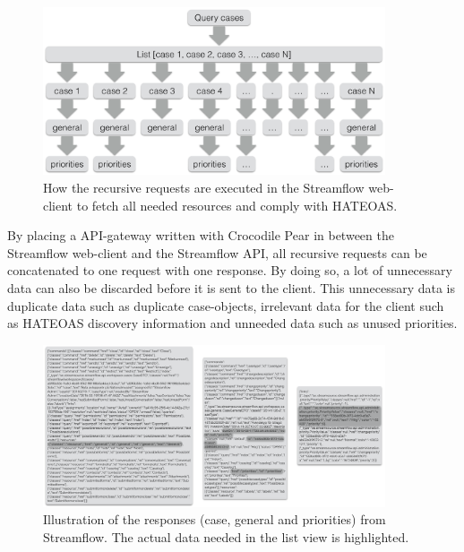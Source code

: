 \documentclass{cslthse-msc}
\begin{document}
\begin{figure}[H]
  \centering
    \begin{center}
      \includegraphics[width=0.9\textwidth]{images/streamflow_cases.png}
    \end{center}
  \caption{How the recursive requests are executed in the Streamflow web-client to fetch all needed resources and comply with HATEOAS.}
\end{figure}

By placing a API-gateway written with Crocodile Pear in between the Streamflow web-client and the Streamflow API, all recursive requests can be concatenated to one request with one response. By doing so, a lot of unnecessary data can also be discarded before it is sent to the client. This unnecessary data is duplicate data such as duplicate case-objects, irrelevant data for the client such as HATEOAS discovery information and unneeded data such as unused priorities.

\begin{figure}[H]
  \centering
    \begin{center}
      \includegraphics[width=0.9\textwidth]{images/streamflow_response.png}
    \end{center}
  \caption{Illustration of the responses (case, general and priorities) from Streamflow. The actual data needed in the list view is highlighted.}
\end{figure}
\end{document}
